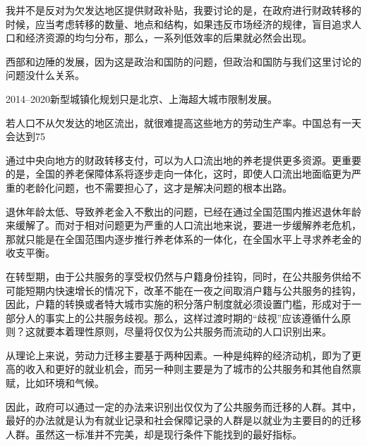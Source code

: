 我并不是反对为欠发达地区提供财政补贴，我要讨论的是，在政府进行财政转移的时候，应当考虑转移的数量、地点和结构，如果违反市场经济的规律，盲目追求人口和经济资源的均匀分布，那么，一系列低效率的后果就必然会出现。

西部和边陲的发展，因为这是政治和国防的问题，但政治和国防与我们这里讨论的问题没什么关系。

2014--2020新型城镇化规划只是北京、上海超大城市限制发展。

若人口不从欠发达的地区流出，就很难提高这些地方的劳动生产率。中国总有一天会达到75%

通过中央向地方的财政转移支付，可以为人口流出地的养老提供更多资源。更重要的是，全国的养老保障体系将逐步走向一体化，这时，即使人口流出地面临更为严重的老龄化问题，也不需要担心了，这才是解决问题的根本出路。

退休年龄太低、导致养老金入不敷出的问题，已经在通过全国范围内推迟退休年龄来缓解了。而对于相对问题更为严重的人口流出地来说，要进一步缓解养老危机，那就只能是在全国范围内逐步推行养老体系的一体化，在全国水平上寻求养老金的收支平衡。

在转型期，由于公共服务的享受权仍然与户籍身份挂钩，同时，在公共服务供给不可能短期内快速增长的情况下，改革不能在一夜之间取消户籍与公共服务的挂钩，因此，户籍的转换或者特大城市实施的积分落户制度就必须设置门槛，形成对于一部分人的事实上的公共服务歧视。那么，这样过渡时期的“歧视”应该遵循什么原则？这就要本着理性原则，尽量将仅仅为公共服务而流动的人口识别出来。

从理论上来说，劳动力迁移主要基于两种因素。一种是纯粹的经济动机，即为了更高的收入和更好的就业机会，而另一种则主要是为了城市的公共服务和其他自然禀赋，比如环境和气候。

因此，政府可以通过一定的办法来识别出仅仅为了公共服务而迁移的人群。其中，最好的办法就是认为有就业记录和社会保障记录的人群是以就业为主要目的的迁移人群。虽然这一标准并不完美，却是现行条件下能找到的最好指标。

